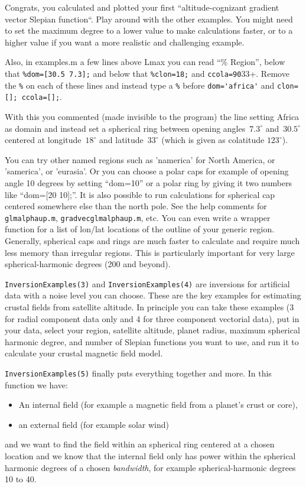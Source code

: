\documentclass[11pt]{article}
\begin{document}
Congrats, you calculated and plotted your first ``altitude-cognizant
gradient vector Slepian function``. Play around with the other
examples. You might need to set the maximum degree to a lower value to
make calculations faster, or to a higher value if you want a more
realistic and challenging example.

Also, in examples.m a few lines above Lmax you can read ``\% Region'',
below that \verb+%dom=[30.5 7.3];+ and below that \verb+%clon=18;+ and
\verb+ccola=90+33+. Remove the \verb+%+ on each of these lines and
instead type a \verb+%+ before \verb+dom='africa'+ and
\verb+clon=[]; ccola=[];+.

With this you commented (made invisible to the program) the line
setting Africa as domain and instead set a spherical ring between
opening angles~$7.3^\circ$ and~$30.5^\circ$ centered at
longitude~$18^\circ$ and latitude~$33^\circ$ (which is given as
colatitude $123^\circ$).

You can try other named regions such as 'namerica' for North America,
or 'samerica', or 'eurasia'. Or you can choose a polar caps for
example of opening angle 10 degrees by setting ``dom=10'' or a polar
ring by giving it two numbers like ``dom=[20 10];''. It is also
possible to run calculations for spherical cap centered somewhere else
than the north pole. See the help comments for \verb+glmalphaup.m+,
\verb+gradvecglmalphaup.m+, etc. You can even write a wrapper function
for a list of lon/lat locations of the outline of your generic
region. Generally, spherical caps and rings are much faster to
calculate and require much less memory than irregular regions. This is
particularly important for very large spherical-harmonic degrees (200
and beyond).

\verb+InversionExamples(3)+ and \verb+InversionExamples(4)+ are inversions for
artificial data with a noise level you can choose. These are the key
examples for estimating crustal fields from satellite altitude. In
principle you can take these examples (3 for radial component data
only and 4 for three component vectorial data), put in your data,
select your region, satellite altitude, planet radius, maximum
spherical harmonic degree, and number of Slepian functions you want to
use, and run it to calculate your crustal magnetic field model.

\verb+InversionExamples(5)+ finally puts everything together and
more. In this function we have:

\begin{itemize}
  \item An internal field (for example a
    magnetic field from a planet's crust or core),
  \item an external field (for example solar wind)
\end{itemize}
and we want to find the field within an spherical ring centered at a
chosen location and we know that the internal field only has power
within the spherical harmonic degrees of a chosen \emph{bandwidth},
for example spherical-harmonic degrees 10 to 40.
\end{document}
